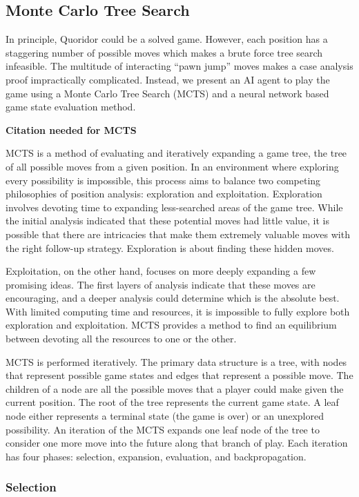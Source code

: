 \documentclass[10pt]{article}
\begin{document}
\subsection{Monte Carlo Tree Search}

In principle, Quoridor could be a solved game. However, each position has a staggering number of possible moves which makes a brute force tree search infeasible. The multitude of interacting ``pawn jump'' moves makes a case analysis proof impractically complicated. Instead, we present an AI agent to play the game using a Monte Carlo Tree Search (MCTS) and a neural network based game state evaluation method.

\textbf{Citation needed for MCTS}

MCTS is a method of evaluating and iteratively expanding a game tree, the tree of all possible moves from a given position. In an environment where exploring every possibility is impossible, this process aims to balance two competing philosophies of position analysis: exploration and exploitation. Exploration involves devoting time to expanding less-searched areas of the game tree. While the initial analysis indicated that these potential moves had little value, it is possible that there are intricacies that make them extremely valuable moves with the right follow-up strategy. Exploration is about finding these hidden moves.

Exploitation, on the other hand, focuses on more deeply expanding a few promising ideas. The first layers of analysis indicate that these moves are encouraging, and a deeper analysis could determine which is the absolute best. With limited computing time and resources, it is impossible to fully explore both exploration and exploitation. MCTS provides a method to find an equilibrium between devoting all the resources to one or the other.

MCTS is performed iteratively. The primary data structure is a tree, with nodes that represent possible game states and edges that represent a possible move. The children of a node are all the possible moves that a player could make given the current position. The root of the tree represents the current game state. A leaf node either represents a terminal state (the game is over) or an unexplored possibility. An iteration of the MCTS expands one leaf node of the tree to consider one more move into the future along that branch of play. Each iteration has four phases: selection, expansion, evaluation, and backpropagation.

\subsubsection{Selection}
\end{document}

